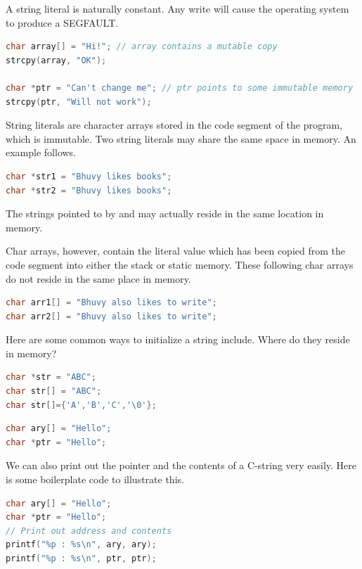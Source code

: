 A string literal is naturally constant.
Any write will cause the operating system to produce a SEGFAULT. 

\begin{lstlisting}[language=C]
char array[] = "Hi!"; // array contains a mutable copy
strcpy(array, "OK");

char *ptr = "Can't change me"; // ptr points to some immutable memory
strcpy(ptr, "Will not work");
\end{lstlisting}

String literals are character arrays stored in the code segment of the program, which is immutable.
Two string literals may share the same space in memory.
An example follows.

\begin{lstlisting}[language=C]
char *str1 = "Bhuvy likes books";
char *str2 = "Bhuvy likes books";
\end{lstlisting}

The strings pointed to by  and  may actually reside in the same location in memory.

Char arrays, however, contain the literal value which has been copied from the code segment into either the stack or static memory.
These following char arrays do not reside in the same place in memory.

\begin{lstlisting}[language=C]
char arr1[] = "Bhuvy also likes to write";
char arr2[] = "Bhuvy also likes to write";
\end{lstlisting}

Here are some common ways to initialize a string include. Where do they reside in memory?

\begin{lstlisting}[language=C]
char *str = "ABC";
char str[] = "ABC";
char str[]={'A','B','C','\0'};
\end{lstlisting}

\begin{lstlisting}[language=C]
char ary[] = "Hello";
char *ptr = "Hello";
\end{lstlisting}

We can also print out the pointer and the contents of a C-string very easily. Here is some boilerplate code to illustrate this.

\begin{lstlisting}[language=C]
char ary[] = "Hello";
char *ptr = "Hello";
// Print out address and contents
printf("%p : %s\n", ary, ary);
printf("%p : %s\n", ptr, ptr);
\end{lstlisting}

